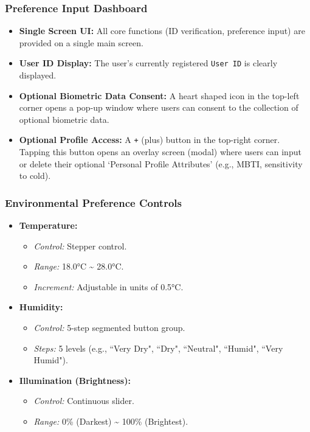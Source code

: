 \documentclass[conference]{IEEEtran}
\begin{document}
\subsubsection{Preference Input Dashboard}
\begin{itemize}
    \item \textbf{Single Screen UI:} All core functions (ID verification, preference input) are provided on a single main screen.
    \item \textbf{User ID Display:} The user's currently registered \texttt{User ID} is clearly displayed.
    \item \textbf{Optional Biometric Data Consent:} A heart shaped icon in the top-left corner opens a pop-up window where users can consent to the collection of optional biometric data.
    \item \textbf{Optional Profile Access:} A \texttt{+} (plus) button in the top-right corner. Tapping this button opens an overlay screen (modal) where users can input or delete their optional `Personal Profile Attributes' (e.g., MBTI, sensitivity to cold).
\end{itemize}

\subsubsection{Environmental Preference Controls}
\begin{itemize}
    \item \textbf{Temperature:}
        \begin{itemize}
            \item \textit{Control:} Stepper control.
            \item \textit{Range:} 18.0°C \textasciitilde{} 28.0°C.
            \item \textit{Increment:} Adjustable in units of 0.5°C.
        \end{itemize}
    \item \textbf{Humidity:}
        \begin{itemize}
            \item \textit{Control:} 5-step segmented button group.
            \item \textit{Steps:} 5 levels (e.g., ``Very Dry", ``Dry", ``Neutral", ``Humid", ``Very Humid").
        \end{itemize}
    \item \textbf{Illumination (Brightness):}
        \begin{itemize}
            \item \textit{Control:} Continuous slider.
            \item \textit{Range:} 0\% (Darkest) \textasciitilde{} 100\% (Brightest).
        \end{itemize}
\end{itemize}
\end{document}
